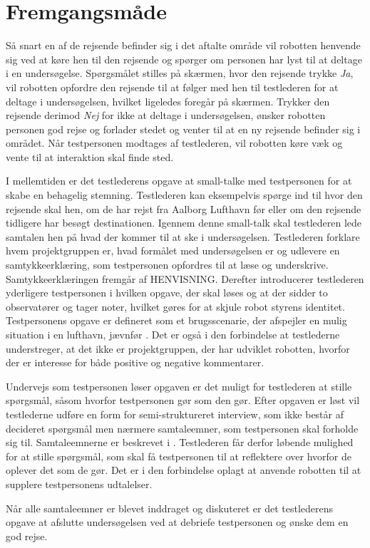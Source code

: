 \section{Fremgangsmåde}
\label{ParametreFremgangsmaade}
%
Så snart en af de rejsende befinder sig i det aftalte område vil robotten henvende sig ved at køre hen til den rejsende og spørger om personen har lyst til at deltage i en undersøgelse. Spørgsmålet stilles på skærmen, hvor den rejsende trykke \textit{Ja}, vil robotten opfordre den rejsende til at følger med hen til testlederen for at deltage i undersøgelsen, hvilket ligeledes foregår på skærmen. Trykker den rejsende derimod \textit{Nej} for ikke at deltage i undersøgelsen, ønsker robotten personen god rejse og forlader stedet og venter til at en ny rejsende befinder sig i området. Når testpersonen modtages af testlederen, vil robotten køre væk og vente til at interaktion skal finde sted. 

I mellemtiden er det testlederens opgave at small-talke med testpersonen for at skabe en behagelig stemning. Testlederen kan eksempelvis spørge ind til hvor den rejsende skal hen, om de har rejst fra Aalborg Lufthavn før eller om den rejsende tidligere har besøgt destinationen. Igennem denne small-talk skal testlederen lede samtalen hen på hvad der kommer til at ske i undersøgelsen. Testlederen forklare hvem projektgruppen er, hvad formålet med undersøgelsen er og udlevere en samtykkeerklæring, som testpersonen opfordres til at læse og underskrive. Samtykkeerklæringen fremgår af HENVISNING. Derefter introducerer testlederen yderligere testpersonen i hvilken opgave, der skal løses og at der sidder to observatører og tager noter, hvilket gøres for at skjule robot styrens identitet. Testpersonens opgave er defineret som et brugsscenarie, der afspejler en mulig situation i en lufthavn, jævnfør . Det er også i den forbindelse at testlederne understreger, at det ikke er projektgruppen, der har udviklet robotten, hvorfor der er interesse for både positive og negative kommentarer. 

Undervejs som testpersonen løser opgaven er det muligt for testlederen at stille spørgsmål, såsom hvorfor testpersonen gør som den gør. Efter opgaven er løst vil testlederne udføre en form for semi-struktureret interview, som ikke består af decideret spørgsmål men nærmere samtaleemner, som testpersonen skal forholde sig til. Samtaleemnerne er beskrevet i . Testlederen får derfor løbende mulighed for at stille spørgsmål, som skal få testpersonen til at reflektere over hvorfor de oplever det som de gør. Det er i den forbindelse oplagt at anvende robotten til at supplere testpersonens udtalelser. 

Når alle samtaleemner er blevet inddraget og diskuteret er det testlederens opgave at afslutte undersøgelsen ved at debriefe testpersonen og ønske dem en god rejse.       



